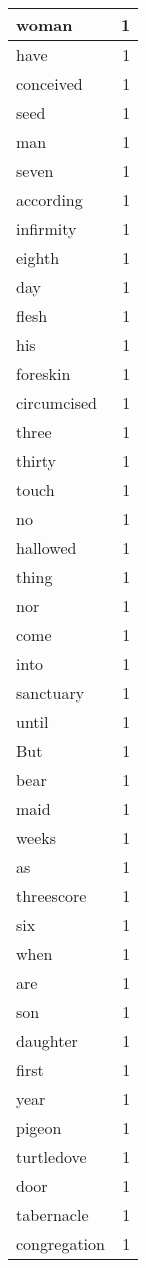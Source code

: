 \begin{center}
\begin{longtable}{l|r}
woman & 1 \\ \hline
have & 1 \\ \hline
conceived & 1 \\ \hline
seed & 1 \\ \hline
man & 1 \\ \hline
seven & 1 \\ \hline
according & 1 \\ \hline
infirmity & 1 \\ \hline
eighth & 1 \\ \hline
day & 1 \\ \hline
flesh & 1 \\ \hline
his & 1 \\ \hline
foreskin & 1 \\ \hline
circumcised & 1 \\ \hline
three & 1 \\ \hline
thirty & 1 \\ \hline
touch & 1 \\ \hline
no & 1 \\ \hline
hallowed & 1 \\ \hline
thing & 1 \\ \hline
nor & 1 \\ \hline
come & 1 \\ \hline
into & 1 \\ \hline
sanctuary & 1 \\ \hline
until & 1 \\ \hline
But & 1 \\ \hline
bear & 1 \\ \hline
maid & 1 \\ \hline
weeks & 1 \\ \hline
as & 1 \\ \hline
threescore & 1 \\ \hline
six & 1 \\ \hline
when & 1 \\ \hline
are & 1 \\ \hline
son & 1 \\ \hline
daughter & 1 \\ \hline
first & 1 \\ \hline
year & 1 \\ \hline
pigeon & 1 \\ \hline
turtledove & 1 \\ \hline
door & 1 \\ \hline
tabernacle & 1 \\ \hline
congregation & 1 \\ \hline

\end{longtable}
\end{center}
